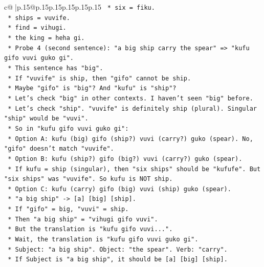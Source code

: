 \documentclass{article}
\begin{document}
{\begin{supertabular}{c@{$\;$}|p{.15\linewidth}@{}p{.15\linewidth}p{.15\linewidth}p{.15\linewidth}p{.15\linewidth}p{.15\linewidth}}
{{{\texttt{            *   six = fiku.} \\
\texttt{            *   ships = vuvife.} \\
\texttt{            *   find = vihugi.} \\
\texttt{            *   the king = heha gi.} \\
\texttt{        *   Probe 4 (second sentence): "a big ship carry the spear" => "kufu gifo vuvi guko gi".} \\
\texttt{            *   This sentence has "big".} \\
\texttt{            *   If "vuvife" is ship, then "gifo" cannot be ship.} \\
\texttt{            *   Maybe "gifo" is "big"? And "kufu" is "ship"?} \\
\texttt{            *   Let's check "big" in other contexts. I haven't seen "big" before.} \\
\texttt{            *   Let's check "ship". "vuvife" is definitely ship (plural). Singular "ship" would be "vuvi".} \\
\texttt{            *   So in "kufu gifo vuvi guko gi":} \\
\texttt{                *   Option A: kufu (big) gifo (ship?) vuvi (carry?) guko (spear). No, "gifo" doesn't match "vuvife".} \\
\texttt{                *   Option B: kufu (ship?) gifo (big?) vuvi (carry?) guko (spear).} \\
\texttt{                    *   If kufu = ship (singular), then "six ships" should be "kufufe". But "six ships" was "vuvife". So kufu is NOT ship.} \\
\texttt{                *   Option C: kufu (carry) gifo (big) vuvi (ship) guko (spear).} \\
\texttt{                    *   "a big ship" {-}> {[}a{]} {[}big{]} {[}ship{]}.} \\
\texttt{                    *   If "gifo" = big, "vuvi" = ship.} \\
\texttt{                    *   Then "a big ship" = "vihugi gifo vuvi".} \\
\texttt{                    *   But the translation is "kufu gifo vuvi...".} \\
\texttt{                    *   Wait, the translation is "kufu gifo vuvi guko gi".} \\
\texttt{                    *   Subject: "a big ship". Object: "the spear". Verb: "carry".} \\
\texttt{                    *   If Subject is "a big ship", it should be {[}a{]} {[}big{]} {[}ship{]}.} \\
}}}
\end{supertabular}}
\end{document}
